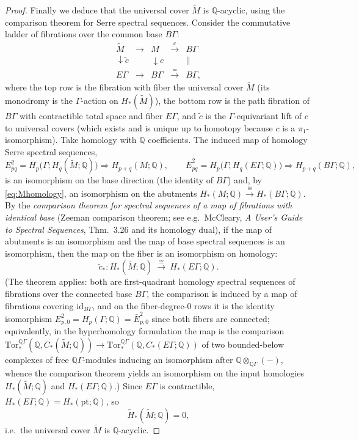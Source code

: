 \documentclass[12pt]{article}
\theoremstyle{definition}
\begin{document}
\begin{proof}
Finally we deduce that the universal cover $\widetilde M$ is
$\mathbb{Q}$-acyclic, using the comparison theorem for Serre spectral sequences.
Consider the commutative ladder of fibrations over the common base $B\Gamma$:
\[
\begin{array}{ccccc}
\widetilde M & \longrightarrow & M & \xrightarrow{\ c\ } & B\Gamma\\[2pt]
\downarrow\widetilde c & & \downarrow c & & \big\|\\[2pt]
E\Gamma & \longrightarrow & B\Gamma & \xrightarrow{=} & B\Gamma,
\end{array}
\]
where the top row is the fibration with fiber the universal cover
$\widetilde M$ (its monodromy is the $\Gamma$-action on $H_*(\widetilde M)$), the
bottom row is the path fibration of $B\Gamma$ with contractible total space and
fiber $E\Gamma$, and $\widetilde c$ is the $\Gamma$-equivariant lift of $c$ to
universal covers (which exists and is unique up to homotopy because $c$ is a
$\pi_1$-isomorphism). Take homology with $\mathbb{Q}$ coefficients. The induced
map of homology Serre spectral sequences,
\[
E^2_{pq}=H_p\big(\Gamma;H_q(\widetilde M;\mathbb{Q})\big)\Rightarrow
H_{p+q}(M;\mathbb{Q}),\qquad
\bar E^2_{pq}=H_p\big(\Gamma;H_q(E\Gamma;\mathbb{Q})\big)\Rightarrow
H_{p+q}(B\Gamma;\mathbb{Q}),
\]
is an isomorphism on the base direction (the identity of $B\Gamma$) and, by
\eqref{eq:Mhomology}, an isomorphism on the abutments
$H_*(M;\mathbb{Q})\xrightarrow{\cong}H_*(B\Gamma;\mathbb{Q})$. By the
\emph{comparison theorem for spectral sequences of a map of fibrations with
identical base} (Zeeman comparison theorem; see e.g.\ McCleary,
\emph{A User's Guide to Spectral Sequences}, Thm.~3.26 and its homology dual),
if the map of abutments is an isomorphism and the map of base spectral sequences
is an isomorphism, then the map on the fiber is an isomorphism on homology:
\[
\widetilde c_*\colon H_*(\widetilde M;\mathbb{Q})\
\xrightarrow{\ \cong\ }\ H_*(E\Gamma;\mathbb{Q}).
\]
(The theorem applies: both are first-quadrant homology spectral sequences of
fibrations over the connected base $B\Gamma$, the comparison is induced by a map
of fibrations covering $\mathrm{id}_{B\Gamma}$, and on the fiber-degree-$0$ rows it
is the identity isomorphism $E^2_{p,0}=H_p(\Gamma;\mathbb{Q})=\bar E^2_{p,0}$
since both fibers are connected; equivalently, in the hyperhomology formulation
the map is the comparison
$\mathrm{Tor}^{\mathbb{Q}\Gamma}_*(\mathbb{Q},C_*(\widetilde M;\mathbb{Q}))\to
\mathrm{Tor}^{\mathbb{Q}\Gamma}_*(\mathbb{Q},C_*(E\Gamma;\mathbb{Q}))$ of two
bounded-below complexes of free $\mathbb{Q}\Gamma$-modules inducing an
isomorphism after $\mathbb{Q}\otimes_{\mathbb{Q}\Gamma}(-)$, whence the
comparison theorem yields an isomorphism on the input homologies $H_*(\widetilde
M;\mathbb{Q})$ and $H_*(E\Gamma;\mathbb{Q})$.) Since $E\Gamma$ is contractible,
$H_*(E\Gamma;\mathbb{Q})=H_*(\mathrm{pt};\mathbb{Q})$, so
\[
\widetilde H_*(\widetilde M;\mathbb{Q})=0,
\]
i.e.\ the universal cover $\widetilde M$ is $\mathbb{Q}$-acyclic.


\end{proof}
\end{document}
